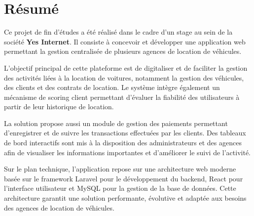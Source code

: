 \chapter*{Résumé}
{}
\thispagestyle{empty}
Ce projet de fin d’études a été réalisé dans le cadre d’un stage au sein de la société \textbf{Yes Internet}. Il consiste à concevoir et développer une application web permettant la gestion centralisée de plusieurs agences de location de véhicules.

L’objectif principal de cette plateforme est de digitaliser et de faciliter la gestion des activités liées à la location de voitures, notamment la gestion des véhicules, des clients et des contrats de location. Le système intègre également un mécanisme de scoring client permettant d’évaluer la fiabilité des utilisateurs à partir de leur historique de location.

La solution propose aussi un module de gestion des paiements permettant d’enregistrer et de suivre les transactions effectuées par les clients. Des tableaux de bord interactifs sont mis à la disposition des administrateurs et des agences afin de visualiser les informations importantes et d’améliorer le suivi de l’activité.

Sur le plan technique, l’application repose sur une architecture web moderne basée sur le framework Laravel pour le développement du backend, React pour l’interface utilisateur et MySQL pour la gestion de la base de données. Cette architecture garantit une solution performante, évolutive et adaptée aux besoins des agences de location de véhicules.



